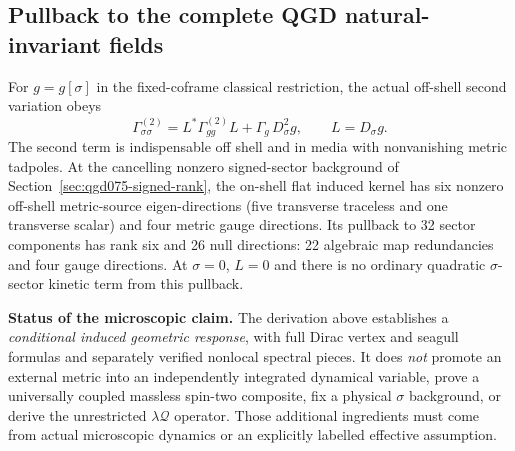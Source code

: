 \documentclass[11pt,a4paper]{article}
\begin{document}
\subsection{Pullback to the complete QGD natural-invariant fields}
\label{sec:qgd075-ind-sigma}
For $g=g[\sigma]$ in the fixed-coframe classical restriction, the
actual off-shell second variation obeys
\begin{equation}\label{eq:qgd075-pullback}
 \boxed{\Gamma_{\sigma\sigma}^{(2)}
 =L^*\Gamma_{gg}^{(2)}L
 +\Gamma_g\,D_\sigma^2g,\qquad L=D_\sigma g.}
\end{equation}
The second term is indispensable off shell and in media with
nonvanishing metric tadpoles. At the cancelling nonzero
signed-sector background of Section~\ref{sec:qgd075-signed-rank},
the on-shell flat induced kernel has six nonzero off-shell
metric-source eigen-directions (five transverse traceless and one
transverse scalar) and four metric gauge directions. Its pullback to
32 sector components has rank six and 26 null directions: 22
algebraic map redundancies and four gauge directions. At
$\sigma=0$, $L=0$ and there is no ordinary quadratic
$\sigma$-sector kinetic term from this pullback.

\noindent\textbf{Status of the microscopic claim.}
The derivation above establishes a \emph{conditional induced geometric
response}, with full Dirac vertex and seagull formulas and separately
verified nonlocal spectral pieces. It does \emph{not} promote an
external metric into an independently integrated dynamical variable,
prove a universally coupled massless spin-two composite, fix a physical
$\sigma$ background, or derive the unrestricted $\lambda\mathcal Q$
operator. Those additional ingredients must come from actual
microscopic dynamics or an explicitly labelled effective assumption.
\end{document}
